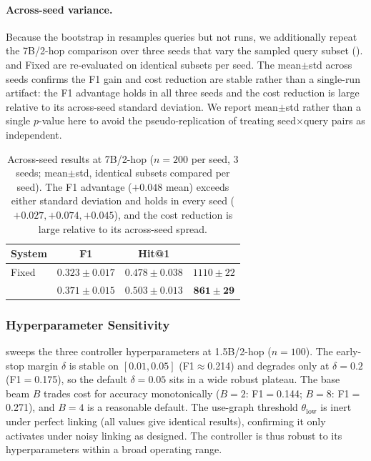 \paragraph{Across-seed variance.}
Because the bootstrap in  resamples queries but not runs, we additionally repeat the 7B/2-hop comparison over three seeds that vary the sampled query subset (). \method{} and Fixed are re-evaluated on identical subsets per seed. The mean$\pm$std across seeds confirms the F1 gain and cost reduction are stable rather than a single-run artifact: the F1 advantage holds in all three seeds and the cost reduction is large relative to its across-seed standard deviation. We report mean$\pm$std rather than a single $p$-value here to avoid the pseudo-replication of treating seed$\times$query pairs as independent.

\begin{table}[t]
\centering
\caption{Across-seed results at 7B/2-hop ($n{=}200$ per seed, 3 seeds; mean$\pm$std, identical subsets compared per seed). The F1 advantage ($+0.048$ mean) exceeds either standard deviation and holds in every seed ($+0.027, +0.074, +0.045$), and the cost reduction is large relative to its across-seed spread.}
\label{tab:sig-seeds}
\small
\begin{tabular}{@{}lccc@{}}
\toprule
System & F1 & Hit@1 & \Toks{} \\
\midrule
Fixed & $0.323\pm0.017$ & $0.478\pm0.038$ & $1110\pm22$ \\
\method{} & $\mathbf{0.371\pm0.015}$ & $\mathbf{0.503\pm0.013}$ & $\mathbf{861\pm29}$ \\
\bottomrule
\end{tabular}
\end{table}

\subsubsection{Hyperparameter Sensitivity}
\label{sec:exp-sens}

 sweeps the three controller hyperparameters at 1.5B/2-hop ($n{=}100$). The early-stop margin $\delta$ is stable on $[0.01,0.05]$ (F1$\approx$0.214) and degrades only at $\delta{=}0.2$ (F1$=$0.175), so the default $\delta{=}0.05$ sits in a wide robust plateau. The base beam $B$ trades cost for accuracy monotonically ($B{=}2$: F1$=$0.144; $B{=}8$: F1$=$0.271), and $B{=}4$ is a reasonable default. The use-graph threshold $\theta_{\text{low}}$ is inert under perfect linking (all values give identical results), confirming it only activates under noisy linking as designed. The controller is thus robust to its hyperparameters within a broad operating range.

